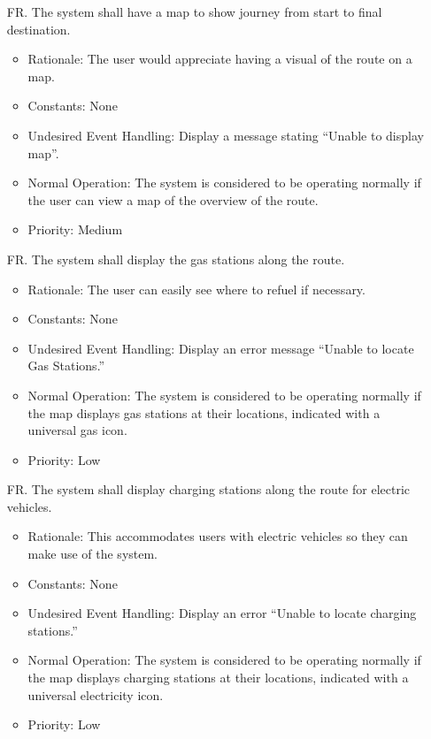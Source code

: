 \documentclass[12pt]{article}
\newcounter{reqnum} %
\begin{document}
\begin{itemize}
\item[FR\refstepcounter{reqnum}\thereqnum. ] The system shall have a map to show journey from start to final destination.
\begin{itemize}
    \item Rationale: The user would appreciate having a visual of the route on a map.
    \item Constants: None
    \item Undesired Event Handling: Display a message stating “Unable to display map”.
    \item Normal Operation: The system is considered to be operating normally if the user can view a map of the overview of the route.
	\item Priority: Medium
\end{itemize}

\item[FR\refstepcounter{reqnum}\thereqnum. ] The system shall display the gas stations along the route.
\begin{itemize}
    \item Rationale: The user can easily see where to refuel if necessary.
    \item Constants: None
    \item Undesired Event Handling: Display an error message “Unable to locate Gas Stations.”
    \item Normal Operation: The system is considered to be operating normally if the map displays gas stations at their locations, indicated with a universal gas icon.
	\item Priority: Low
\end{itemize}

\item[FR\refstepcounter{reqnum}\thereqnum. ] The system shall display charging stations along the route for electric vehicles.
\begin{itemize}
    \item Rationale: This accommodates users with electric vehicles so they can make use of the system.
    \item Constants: None
    \item Undesired Event Handling: Display an error “Unable to locate charging stations.”
    \item Normal Operation: The system is considered to be operating normally if the map displays charging stations at their locations, indicated with a universal electricity icon.
	\item Priority: Low
\end{itemize}


\end{itemize}
\end{document}
